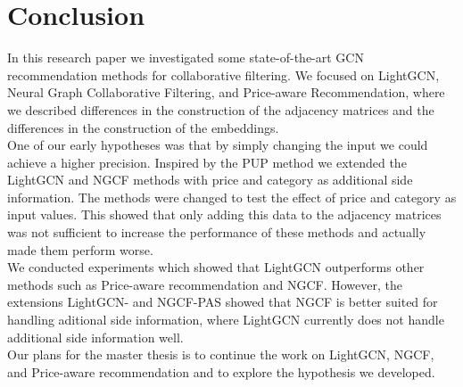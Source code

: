 \section{Conclusion}
In this research paper we investigated some state-of-the-art GCN recommendation methods for collaborative filtering.
We focused on LightGCN, Neural Graph Collaborative Filtering, and Price-aware Recommendation, where we described differences in the construction of the adjacency matrices and the differences in the construction of the embeddings.
\\
One of our early hypotheses was that by simply changing the input we could achieve a higher precision.
Inspired by the PUP method we extended the LightGCN and NGCF methods with price and category as additional side information.
The methods were changed to test the effect of price and category as input values.
This showed that only adding this data to the adjacency matrices was not sufficient to increase the performance of these methods and actually made them perform worse.
\\
We conducted experiments which showed that LightGCN outperforms other methods such as Price-aware recommendation and NGCF.
However, the extensions LightGCN- and NGCF-PAS showed that NGCF is better suited for handling aditional side information, where LightGCN currently does not handle additional side information well.
\\
Our plans for the master thesis is to continue the work on LightGCN, NGCF, and Price-aware recommendation and to explore the hypothesis we developed.
